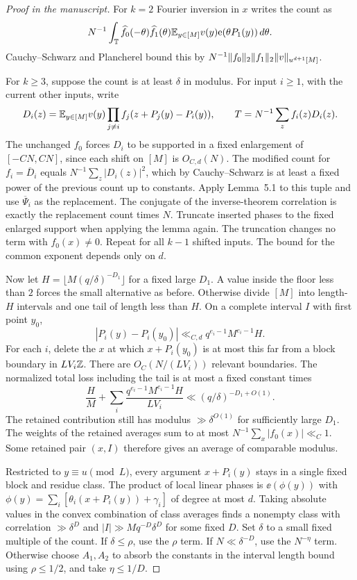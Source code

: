 \begin{proof}[Proof in the manuscript]
\leanok
For $k=2$ Fourier inversion in $x$ writes the count as
\[
 N^{-1}\int_\mathbb T\widehat f_0(-\theta)\widehat f_1(\theta)
       \mathbb E_{y\in[M]}v(y)\mathrm e(\theta P_1(y))\,d\theta.
\]
Cauchy--Schwarz and Plancherel bound this by
$N^{-1}\lVert f_0\rVert_2\lVert f_1\rVert_2\lVert v\rVert_{u^{d+1}[M]}$.

For $k\ge3$, suppose the count is at least $\delta$ in modulus.
For input $i\ge1$, with the current other inputs, write
\[
 D_i(z)=\mathbb E_{y\in[M]}v(y)\prod_{j\ne i}
          f_j(z+P_j(y)-P_i(y)),\qquad
 T=N^{-1}\sum_z f_i(z)D_i(z).
\]
The unchanged $f_0$ forces $D_i$ to be supported in a fixed
enlargement of $[-CN,CN]$, since each shift on $[M]$ is
$O_{C,d}(N)$. The modified count for $f_i=\overline D_i$ equals
$N^{-1}\sum_z|D_i(z)|^2$, which by Cauchy--Schwarz is at least a fixed
power of the previous count up to constants. Apply Lemma~5.1 to this
tuple and use $\overline\Psi_i$ as the replacement. The conjugate of
the inverse-theorem correlation is exactly the replacement count
times $N$. Truncate inserted phases to the fixed enlarged support
when applying the lemma again. The truncation changes no term with
$f_0(x)\ne0$. Repeat for all $k-1$ shifted inputs. The bound for the
common exponent depends only on $d$.

Now let $H=\lfloor M(q/\delta)^{-D_1}\rfloor$ for a fixed large
$D_1$. A value inside the floor less than $2$ forces the small
alternative as before. Otherwise divide $[M]$ into length-$H$
intervals and one tail of length less than $H$. On a complete
interval $I$ with first point $y_0$,
\[
 |P_i(y)-P_i(y_0)|\ll_{C,d}q^{e_i-1}M^{e_i-1}H .
\]
For each $i$, delete the $x$ at which $x+P_i(y_0)$ is at most this
far from a block boundary in $LV_i\mathbb Z$. There are
$O_C(N/(LV_i))$ relevant boundaries. The normalized total loss
including the tail is at most a fixed constant times
\[
 \frac HM+\sum_i\frac{q^{e_i-1}M^{e_i-1}H}{LV_i}
 \ll(q/\delta)^{-D_1+O(1)}.
\]
The retained contribution still has modulus $\gg\delta^{O(1)}$
for sufficiently large $D_1$. The weights of the retained averages
sum to at most $N^{-1}\sum_x|f_0(x)|\ll_C1$. Some retained
pair $(x,I)$ therefore gives an average of comparable modulus.

Restricted to $y\equiv u\pmod L$, every argument $x+P_i(y)$
stays in a single fixed block and residue class. The product of local
linear phases is $\ee(\phi(y))$ with
$\phi(y)=\sum_i[\theta_i(x+P_i(y))+\gamma_i]$ of degree at most $d$.
Taking absolute values in the convex combination of class averages
finds a nonempty class with correlation $\gg\delta^{D}$ and
$|I|\gg Mq^{-D}\delta^D$ for some fixed $D$.
Set $\delta$ to a small fixed multiple of the count.
If $\delta\le\rho$, use the $\rho$ term.
If $N\ll\delta^{-D}$, use the $N^{-\eta}$ term.
Otherwise choose $A_1,A_2$ to absorb the constants in the interval
length bound using $\rho\le1/2$, and take $\eta\le1/D$.
\end{proof}
